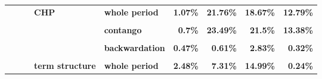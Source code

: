 \documentclass[
  authoryear,
  preprint,
  3p]{elsarticle}
\begin{document}
\begin{landscape}
\begin{longtable}[t]{>{}l>{}l>{}l>{}l>{}l>{}r>{}r>{}r>{}r}
\textbf{} & \textbf{} & \textbf{} & \textbf{CHP} & \textbf{whole period} & \textcolor[HTML]{4285f4}{\textbf{1.07\%}} & \textcolor[HTML]{4285f4}{\textbf{21.76\%}} & \textcolor[HTML]{4285f4}{\textbf{18.67\%}} & \textcolor[HTML]{4285f4}{\textbf{12.79\%}}\\
\textbf{\cellcolor{gray!10}{}} & \textbf{\cellcolor{gray!10}{}} & \textbf{\cellcolor{gray!10}{}} & \textbf{\cellcolor{gray!10}{}} & \textbf{\cellcolor{gray!10}{backwardation}} & \textcolor[HTML]{4285f4}{\textbf{\cellcolor{gray!10}{1.66\%}}} & \textcolor[HTML]{4285f4}{\textbf{\cellcolor{gray!10}{20.33\%}}} & \textcolor[HTML]{4285f4}{\textbf{\cellcolor{gray!10}{15.15\%}}} & \textcolor[HTML]{4285f4}{\textbf{\cellcolor{gray!10}{12.71\%}}}\\
\textbf{} & \textbf{} & \textbf{} & \textbf{} & \textbf{contango} & \textcolor[HTML]{4285f4}{\textbf{0.7\%}} & \textcolor[HTML]{4285f4}{\textbf{23.49\%}} & \textcolor[HTML]{4285f4}{\textbf{21.5\%}} & \textcolor[HTML]{4285f4}{\textbf{13.38\%}}\\
\textbf{\cellcolor{gray!10}{}} & \textbf{\cellcolor{gray!10}{}} & \textbf{\cellcolor{gray!10}{}} & \textbf{\cellcolor{gray!10}{open interest}} & \textbf{\cellcolor{gray!10}{whole period}} & \textcolor[HTML]{4285f4}{\textbf{\cellcolor{gray!10}{0.5\%}}} & \textcolor[HTML]{4285f4}{\textbf{\cellcolor{gray!10}{0.91\%}}} & \textcolor[HTML]{4285f4}{\textbf{\cellcolor{gray!10}{3.68\%}}} & \textcolor[HTML]{4285f4}{\textbf{\cellcolor{gray!10}{0.27\%}}}\\
\addlinespace
\textbf{} & \textbf{} & \textbf{} & \textbf{} & \textbf{backwardation} & \textcolor[HTML]{4285f4}{\textbf{0.47\%}} & \textcolor[HTML]{4285f4}{\textbf{0.61\%}} & \textcolor[HTML]{4285f4}{\textbf{2.83\%}} & \textcolor[HTML]{4285f4}{\textbf{0.32\%}}\\
\textbf{\cellcolor{gray!10}{}} & \textbf{\cellcolor{gray!10}{}} & \textbf{\cellcolor{gray!10}{}} & \textbf{\cellcolor{gray!10}{}} & \textbf{\cellcolor{gray!10}{contango}} & \textcolor[HTML]{4285f4}{\textbf{\cellcolor{gray!10}{0.61\%}}} & \textcolor[HTML]{4285f4}{\textbf{\cellcolor{gray!10}{1.28\%}}} & \textcolor[HTML]{4285f4}{\textbf{\cellcolor{gray!10}{4.31\%}}} & \textcolor[HTML]{4285f4}{\textbf{\cellcolor{gray!10}{0.24\%}}}\\
\textbf{} & \textbf{} & \textbf{} & \textbf{term structure} & \textbf{whole period} & \textcolor[HTML]{4285f4}{\textbf{2.48\%}} & \textcolor[HTML]{4285f4}{\textbf{7.31\%}} & \textcolor[HTML]{4285f4}{\textbf{14.99\%}} & \textcolor[HTML]{4285f4}{\textbf{0.24\%}}\\

\end{longtable}
\end{landscape}
\end{document}
